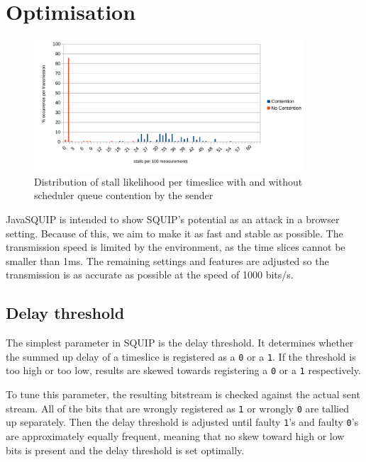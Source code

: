 \documentclass[11pt,
  titlepage=false,
  parskip=half,      %
]{scrreprt}
\begin{document}
\chapter{Optimisation}
\label{ch:optimisation}
\begin{figure}
\centering
\includegraphics[width=0.9\textwidth]{figures/contentionhistogram}

\caption{Distribution of stall likelihood per timeslice with and without scheduler queue contention by the sender}
\label{fig:contentionhistogram}
\end{figure}

JavaSQUIP is intended to show SQUIP's potential as an attack in a browser setting.
Because of this, we aim to make it as fast and stable as possible.
The transmission speed is limited by the environment, as the time slices cannot be smaller than 1ms.
The remaining settings and features are adjusted so the transmission is as accurate as possible at the speed of 1000 bits/s.

\section{Delay threshold}
\label{sec:delaythreshold}

The simplest parameter in SQUIP is the delay threshold.
It determines whether the summed up delay of a timeslice is registered as a \texttt{0} or a \texttt{1}.
If the threshold is too high or too low, results are skewed towards registering a \texttt{0} or a \texttt{1} respectively.

To tune this parameter, the resulting bitstream is checked against the actual sent stream.
All of the bits that are wrongly registered as \texttt{1} or wrongly \texttt{0} are tallied up separately.
Then the delay threshold is adjusted until faulty \texttt{1}'s and faulty \texttt{0}'s are approximately equally frequent,
meaning that no skew toward high or low bits is present and the delay threshold is set optimally.
\end{document}
